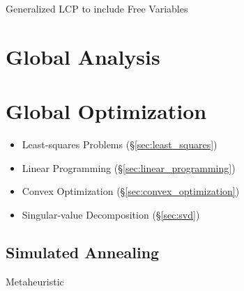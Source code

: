 Generalized LCP to include Free Variables



\section{Global Analysis}\label{sec:global_analysis}

\section{Global Optimization}\label{sec:global_optimization}

\begin{itemize}
  \item Least-squares Problems (\S\ref{sec:least_squares})
  \item Linear Programming (\S\ref{sec:linear_programming})
  \item Convex Optimization (\S\ref{sec:convex_optimization})
  \item Singular-value Decomposition (\S\ref{sec:svd})
\end{itemize}



\subsection{Simulated Annealing}\label{sec:simualted_annealing}

Metaheuristic
